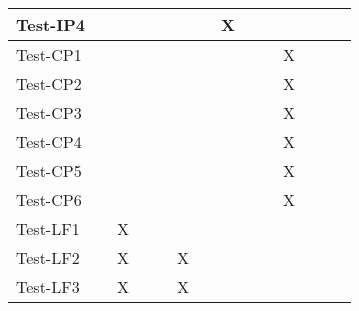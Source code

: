 \documentclass[12pt, titlepage]{article}
\begin{document}
\begin{table}[H]
\begin{adjustwidth}{-0.3in}{-0.5in}
{\begin{tabular}{c|c|c|c|c|c|c|c|c|c|c|c|c|c|}
\multicolumn{1}{|l|}{{Test-IP4}}   &             &             &             &             &             &             &       X      &             &              &              &                           &  &                    \\ \hline
\multicolumn{1}{|l|}{{Test-CP1}}   &             &             &             &             &             &             &             &             &              &   X          &                           &  &                    \\ \hline
\multicolumn{1}{|l|}{{Test-CP2}}   &             &             &             &             &             &             &            &             &              &        X     &                           &  &                    \\ \hline
\multicolumn{1}{|l|}{{Test-CP3}}   &             &             &             &             &             &             &            &             &              &         X    &                          &  &                    \\ \hline
\multicolumn{1}{|l|}{{Test-CP4}}   &             &             &             &             &             &             &            &             &              &      X       &                           &  &                    \\ \hline
\multicolumn{1}{|l|}{{Test-CP5}}   &             &             &             &             &             &             &            &             &              &      X       &                           &  &                    \\ \hline
\multicolumn{1}{|l|}{{Test-CP6}}   &             &             &             &             &             &             &            &             &              &      X       &                           &  &                    \\ \hline
\multicolumn{1}{|l|}{{Test-LF1}}   &             &         X    &             &             &             &             &             &             &              &              &                           &  &                    \\ \hline
\multicolumn{1}{|l|}{{Test-LF2}}   &             &        X     &             &             &     X        &             &             &             &              &              &                           &  &                    \\ \hline
\multicolumn{1}{|l|}{{Test-LF3}}   &             &           X  &             &             &    X         &             &             &             &              &              &                           &  &                    \\ \hline

\end{tabular}}
\end{adjustwidth}
\end{table}
\end{document}
